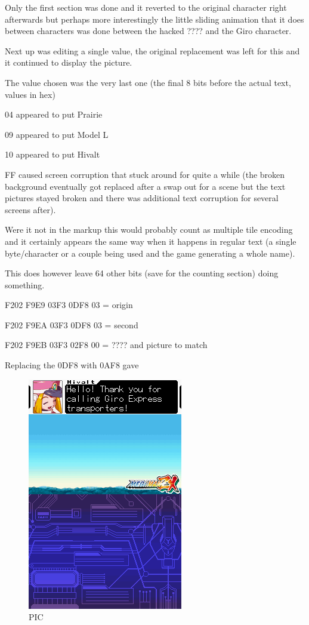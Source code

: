 \documentclass[
]{book}
\begin{document}
Only the first section was done and it reverted to the original character right afterwards but perhaps more interestingly the little sliding animation that it does between characters was done between the hacked ???? and the Giro character.

Next up was editing a single value, the original replacement was left for this and it continued to display the picture.

The value chosen was the very last one (the final 8 bits before the actual text, values in hex)

04 appeared to put Prairie

09 appeared to put Model L

10 appeared to put Hivalt

FF caused screen corruption that stuck around for quite a while (the broken background eventually got replaced after a swap out for a scene but the text pictures stayed broken and there was additional text corruption for several screens after).

Were it not in the markup this would probably count as multiple tile encoding and it certainly appears the same way when it happens in regular text (a single byte/character or a couple being used and the game generating a whole name).

This does however leave 64 other bits (save for the counting section) doing something.

F202 F9E9 03F3 0DF8 03 = origin

F202 F9EA 03F3 0DF8 03 = second

F202 F9EB 03F3 02F8 00 = ???? and picture to match

Replacing the 0DF8 with 0AF8 gave

\begin{figure}
\centering
\includegraphics{images/108_home_fast6191_romhackingguide_unrenamed_fil___iginal_borders_romhackingguidemarkupexedit3.png}
\caption{PIC}
\end{figure}
\end{document}
